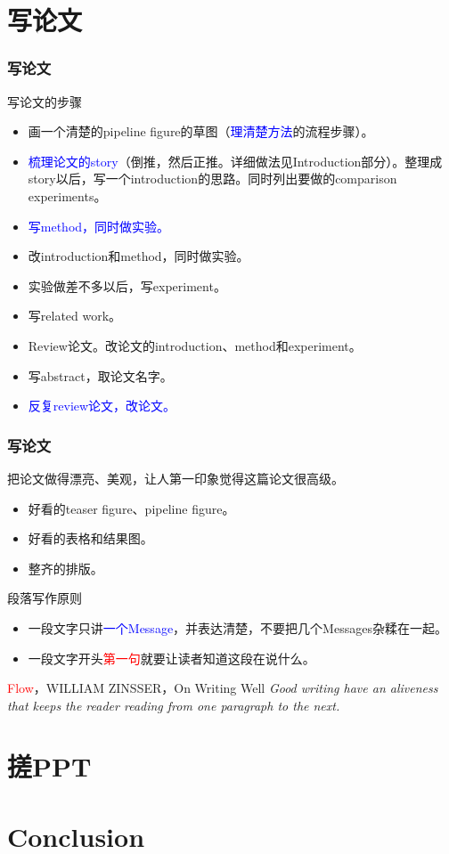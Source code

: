 \documentclass{beamer}
\begin{document}
\section{写论文}
\begin{frame}
    \frametitle{写论文}
    \begin{block}{写论文的步骤}
        \begin{itemize}
            \item 画一个清楚的pipeline figure的草图（\textcolor{blue}{理清楚方法}的流程步骤）。
            \item \textcolor{blue}{梳理论文的story}（倒推，然后正推。详细做法见Introduction部分）。整理成story以后，写一个introduction的思路。同时列出要做的comparison experiments。
            \item \textcolor{blue}{写method，同时做实验。}
            \item 改introduction和method，同时做实验。
            \item 实验做差不多以后，写experiment。
            \item 写related work。
            \item Review论文。改论文的introduction、method和experiment。
            \item 写abstract，取论文名字。
            \item \textcolor{blue}{反复review论文，改论文。}
        \end{itemize}
    \end{block}
\end{frame}

\begin{frame}
    \frametitle{写论文}
    \begin{block}{把论文做得漂亮、美观，让人第一印象觉得这篇论文很高级。}
        \begin{itemize}
            \item 好看的teaser figure、pipeline figure。
            \item 好看的表格和结果图。
            \item 整齐的排版。
        \end{itemize}
    \end{block}
    \begin{block}{段落写作原则}
        \begin{itemize}
            \item 一段文字只讲\textcolor{blue}{一个Message}，并表达清楚，不要把几个Messages杂糅在一起。
            \item 一段文字开头\textcolor{red}{第一句}就要让读者知道这段在说什么。
        \end{itemize}
    \end{block}
    \begin{block}{\textcolor{red}{Flow}，WILLIAM ZINSSER，On Writing Well}
        \textit{Good writing have an aliveness that keeps the reader reading from one paragraph to the next.}
    \end{block}
\end{frame}
\section{搓PPT}

\section{Conclusion}
\end{document}
